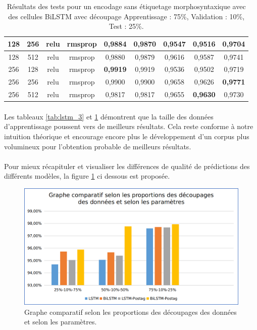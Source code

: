 \begin{table}[H]
{\begin{tabular}{|c|c|c|c|c|c|c|c|c|}
				128 & 256 & relu & rmsprop & 0,9884 & 0,9870 & 0,9547 & 0,9516 & 0,9704 \\ \hline
				128 & 512 & relu & rmsprop & 0,9880 & 0,9879 & 0,9616 & 0,9587 & 0,9741 \\ \hline
				256 & 128 & relu & rmsprop & \textbf{0,9919} & 0,9919 & 0,9536 & 0,9502 & 0,9719 \\ \hline
				\rowcolor[HTML]{96FFFB} 
				256 & 256 & relu & rmsprop & 0,9900 & 0,9900 & 0,9658 & 0,9626 & \textbf{0,9771} \\ \hline
				256 & 512 & relu & rmsprop & 0,9817 & 0,9817 & 0,9655 & \textbf{0,9630} & 0,9730 \\ \hline
			\end{tabular}%
		}
		\caption{Résultats des tests pour un encodage sans étiquetage morphosyntaxique avec des cellules BiLSTM avec découpage Apprentissage : 75\%, Validation : 10\%, Test : 25\%.}
		\label{tab:bilstm_3}
	\end{table}
	\paragraph{}
	Les tableaux \ref{tab:lstm_3} et \ref{tab:bilstm_3} démontrent que la taille des données d'apprentissage poussent vers de meilleurs résultats. Cela reste conforme à notre intuition théorique et encourage encore plus le développement d'un corpus plus volumineux pour l'obtention probable de meilleurs résultats.
	
	\paragraph{}
	Pour mieux récapituler et visualiser les différences de qualité de prédictions des différents modèles, la figure \ref{compare} ci dessous est proposée.
	
	\begin{figure}[H]
		\centering
		\includegraphics[width=.9\linewidth]{images/implementation/graphs.png} 
		\caption{Graphe comparatif selon les proportions des découpages des données et selon les paramètres.}
		\label{compare}
	\end{figure}
